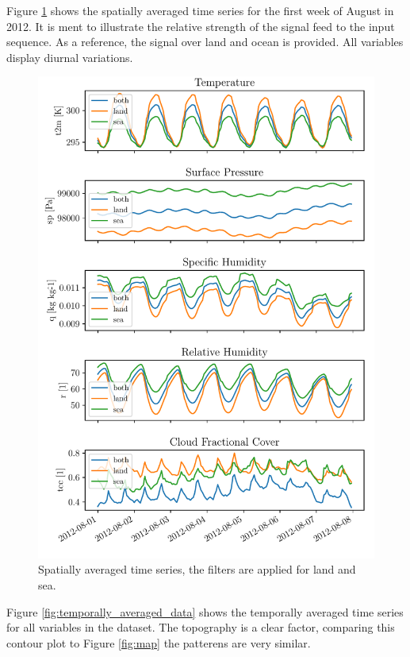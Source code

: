 Figure \ref{fig:random_week} shows the spatially averaged time series for the first week of August in 2012. It is ment to illustrate the relative strength of the signal feed to the input sequence. As a reference, the signal over land and ocean is provided. All variables display diurnal variations.

\begin{figure}[ht]
    \centering
    \includegraphics{python_figs/spatially_averaged_one_week_from_2012-08-01.pdf}
    \caption{Spatially averaged time series, the filters are applied for land and sea.}
    \label{fig:random_week}
\end{figure}

Figure \ref{fig:temporally_averaged_data} shows the temporally averaged time series for all variables in the dataset. The topography is a clear factor, comparing this contour plot to Figure \ref{fig:map} the patterens are very similar. 

